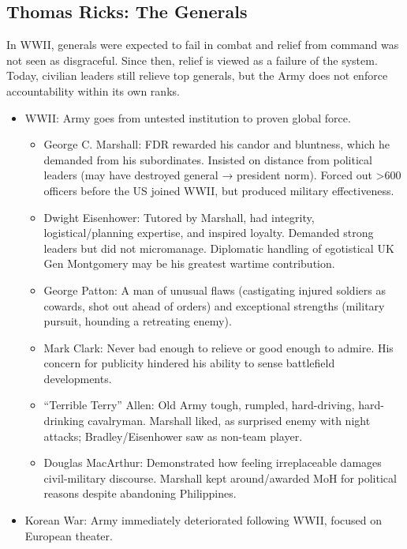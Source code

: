 \documentclass[
]{article}
\begin{document}
\hypertarget{thomas-ricks-the-generals}{%
\subsection{Thomas Ricks: The
Generals}\label{thomas-ricks-the-generals}}

In WWII, generals were expected to fail in combat and relief from
command was not seen as disgraceful. Since then, relief is viewed as a
failure of the system. Today, civilian leaders still relieve top
generals, but the Army does not enforce accountability within its own
ranks.

\begin{itemize}
\item
  WWII: Army goes from untested institution to proven global force.

  \begin{itemize}
  \item
    George C. Marshall: FDR rewarded his candor and bluntness, which he
    demanded from his subordinates. Insisted on distance from political
    leaders (may have destroyed general → president norm). Forced out
    \textgreater600 officers before the US joined WWII, but produced
    military effectiveness.
  \item
    Dwight Eisenhower: Tutored by Marshall, had integrity,
    logistical/planning expertise, and inspired loyalty. Demanded strong
    leaders but did not micromanage. Diplomatic handling of egotistical
    UK Gen Montgomery may be his greatest wartime contribution.
  \item
    George Patton: A man of unusual flaws (castigating injured soldiers
    as cowards, shot out ahead of orders) and exceptional strengths
    (military pursuit, hounding a retreating enemy).
  \item
    Mark Clark: Never bad enough to relieve or good enough to admire.
    His concern for publicity hindered his ability to sense battlefield
    developments.
  \item
    ``Terrible Terry'' Allen: Old Army tough, rumpled, hard-driving,
    hard-drinking cavalryman. Marshall liked, as surprised enemy with
    night attacks; Bradley/Eisenhower saw as non-team player.
  \item
    Douglas MacArthur: Demonstrated how feeling irreplaceable damages
    civil-military discourse. Marshall kept around/awarded MoH for
    political reasons despite abandoning Philippines.
  \end{itemize}
\item
  Korean War: Army immediately deteriorated following WWII, focused on
  European theater.


\end{itemize}
\end{document}
